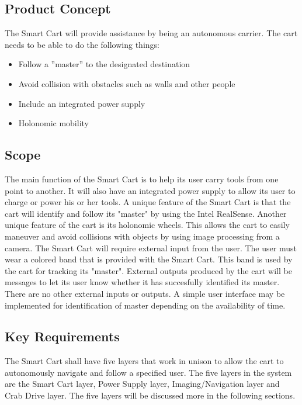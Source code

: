 \subsection{Product Concept}
The Smart Cart will provide assistance by being an autonomous carrier. The cart needs to be able to do the following things:
\begin{itemize}
	\item Follow a ''master'' to the designated destination
	\item Avoid collision with obstacles such as walls and other people
	\item Include an integrated power supply
	\item Holonomic mobility
\end{itemize}

\subsection{Scope}
The main function of the Smart Cart is to help its user carry tools from one point to another. It will also have an integrated power supply to allow its user to charge or power his or her tools. A unique feature of the Smart Cart is that the cart will identify and follow its "master" by using the Intel RealSense. Another unique feature of the cart is its holonomic wheels. This allows the cart to easily maneuver and avoid collisions with objects by using image processing from a camera. The Smart Cart will require external input from the user. The user must wear a colored band that is provided with the Smart Cart. This band is used by the cart for tracking its "master". External outputs produced by the cart will be messages to let its user know whether it has succesfully identified its master. There are no other external inputs or outputs. A simple user interface may be implemented for identification of master depending on the availability of time. 

\subsection{Key Requirements}
The Smart Cart shall have five layers that work in unison to allow the cart to autonomously navigate and follow a specified user. The five layers in the system are the Smart Cart layer, Power Supply layer, Imaging/Navigation layer and Crab Drive layer. The five layers will be discussed more in the following sections.